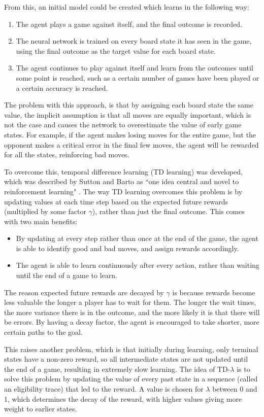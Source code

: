 From this, an initial model could be created which learns in the following way:
\begin{enumerate}
    \item The agent plays a game against itself, and the final outcome is recorded.
    \item The neural network is trained on every board state it has seen in the game, using the final outcome as the target value for each board state.
    \item The agent continues to play against itself and learn from the outcomes until some point is reached, such as a certain number of games have been played or a certain accuracy is reached.
\end{enumerate}

The problem with this approach, is that by assigning each board state the same value, the implicit assumption is that all moves are equally important, which is not the case and causes the network to overestimate the value of early game states.
For example, if the agent makes losing moves for the entire game, but the opponent makes a critical error in the final few moves, the agent will be rewarded for all the states, reinforcing bad moves.

To overcome this, temporal difference learning (TD learning) was developed, which was described by Sutton and Barto as ``one idea central and novel to reinforcement learning" \cite{Sutton2018}.
The way TD learning overcomes this problem is by updating values at each time step based on the expected future rewards (multiplied by some factor $\gamma$), rather than just the final outcome. This comes with two main benefits:
\begin{itemize}
    \item By updating at every step rather than once at the end of the game, the agent is able to identify good and bad moves, and assign rewards accordingly.
    \item The agent is able to learn continuously after every action, rather than waiting until the end of a game to learn.
\end{itemize}
The reason expected future rewards are decayed by $\gamma$ is because rewards become less valuable the longer a player has to wait for them. 
The longer the wait times, the more variance there is in the outcome, and the more likely it is that there will be errors. 
By having a decay factor, the agent is encouraged to take shorter, more certain paths to the goal.

This raises another problem, which is that initially during learning, only terminal states have a non-zero reward, so all intermediate states are not updated until the end of a game, resulting in extremely slow learning.
The idea of TD-$\lambda$ is to solve this problem by updating the value of every past state in a sequence (called an eligibility trace) that led to the reward.
A value is chosen for $\lambda$ between 0 and 1, which determines the decay of the reward, with higher values giving more weight to earlier states.


